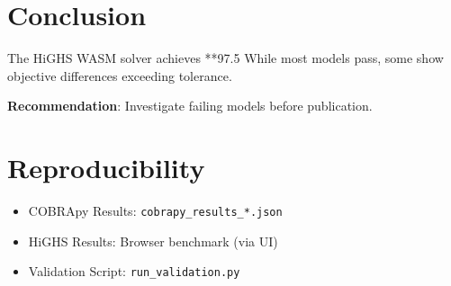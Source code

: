 \documentclass{article}
\begin{document}
\section{Conclusion}

The HiGHS WASM solver achieves **97.5%
While most models pass, some show objective differences exceeding tolerance.

\textbf{Recommendation}: Investigate failing models before publication.

\section{Reproducibility}

\begin{itemize}
    \item COBRApy Results: \texttt{cobrapy\_results\_*.json}
    \item HiGHS Results: Browser benchmark (via UI)
    \item Validation Script: \texttt{run\_validation.py}
\end{itemize}
\end{document}
